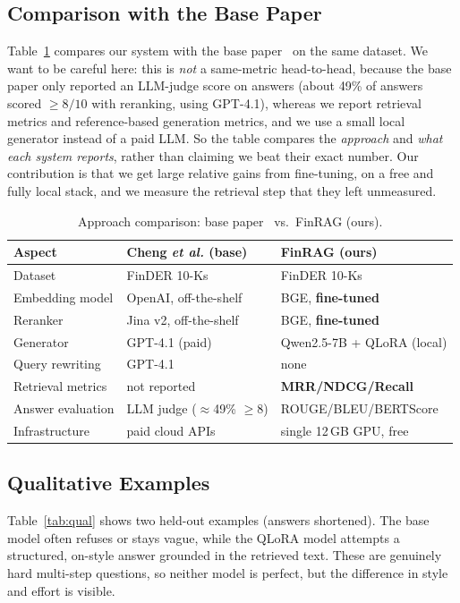 \documentclass[conference]{IEEEtran}
\begin{document}
\subsection{Comparison with the Base Paper}
Table~\ref{tab:vsbase} compares our system with the base paper~\cite{basepaper2026} on the same dataset.
We want to be careful here: this is \emph{not} a same-metric head-to-head, because the base paper only
reported an LLM-judge score on answers (about 49\% of answers scored $\geq 8/10$ with reranking, using
GPT-4.1), whereas we report retrieval metrics and reference-based generation metrics, and we use a small
local generator instead of a paid LLM. So the table compares the \emph{approach} and \emph{what each
system reports}, rather than claiming we beat their exact number. Our contribution is that we get large
relative gains from fine-tuning, on a free and fully local stack, and we measure the retrieval step that
they left unmeasured.

\begin{table}[t]
\caption{Approach comparison: base paper~\cite{basepaper2026} vs.\ FinRAG (ours).}
\label{tab:vsbase}
\centering
\small
\renewcommand{\arraystretch}{1.2}
\begin{tabular}{p{2.4cm}p{2.4cm}p{2.4cm}}
\toprule
Aspect & Cheng \textit{et al.} (base) & FinRAG (ours) \\
\midrule
Dataset & FinDER 10-Ks & FinDER 10-Ks \\
Embedding model & OpenAI, off-the-shelf & BGE, \textbf{fine-tuned} \\
Reranker & Jina v2, off-the-shelf & BGE, \textbf{fine-tuned} \\
Generator & GPT-4.1 (paid) & Qwen2.5-7B + QLoRA (local) \\
Query rewriting & GPT-4.1 & none \\
Retrieval metrics & not reported & \textbf{MRR/NDCG/Recall} \\
Answer evaluation & LLM judge ($\approx$49\% $\geq$8) & ROUGE/BLEU/BERTScore \\
Infrastructure & paid cloud APIs & single 12\,GB GPU, free \\
\bottomrule
\end{tabular}
\end{table}

\subsection{Qualitative Examples}
Table~\ref{tab:qual} shows two held-out examples (answers shortened). The base model often refuses or
stays vague, while the QLoRA model attempts a structured, on-style answer grounded in the retrieved text.
These are genuinely hard multi-step questions, so neither model is perfect, but the difference in style
and effort is visible.
\end{document}
